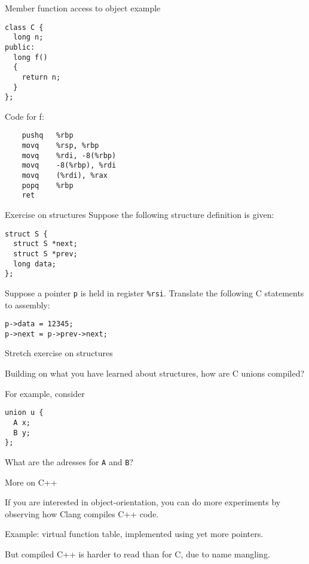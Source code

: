 \documentclass[landscape]{beamer}
\begin{document}
\begin{frame}[fragile]{Member function access to object example}
\begin{minipage}{.5\textwidth}
\begin{verbatim}
class C {
  long n;
public:
  long f() 
  { 
    return n; 
  }
};
\end{verbatim}
\end{minipage}
%
\begin{minipage}{.4\textwidth}
Code for f:
\begin{verbatim}
	pushq	%rbp
	movq	%rsp, %rbp
	movq	%rdi, -8(%rbp)
	movq	-8(%rbp), %rdi
	movq	(%rdi), %rax
	popq	%rbp
	ret
\end{verbatim}
\end{minipage}

\end{frame}
\begin{frame}[fragile]{Exercise on structures}
Suppose the following structure definition is given:
\begin{verbatim}
struct S {
  struct S *next;
  struct S *prev;
  long data;
};
\end{verbatim}
%
Suppose a pointer \texttt p is held in register \texttt{\%rsi}. Translate the following C statements to assembly:
\begin{verbatim}
p->data = 12345;
p->next = p->prev->next;
\end{verbatim}
\end{frame}

\begin{frame}[fragile]{Stretch exercise on structures}

Building on what you have learned about structures, how are C unions compiled?

For example, consider 
\begin{verbatim}
union u {
  A x;
  B y;
};
\end{verbatim}

What are the adresses for \texttt{A} and \texttt{B}?
\end{frame}

\begin{frame}{More on C++}

If you are interested in object-orientation, you can do more experiments by observing how Clang compiles C++ code.

Example: virtual function table, implemented using yet more pointers.

But compiled C++ is harder to read than for C, due to name mangling. 
\end{frame}
\end{document}

